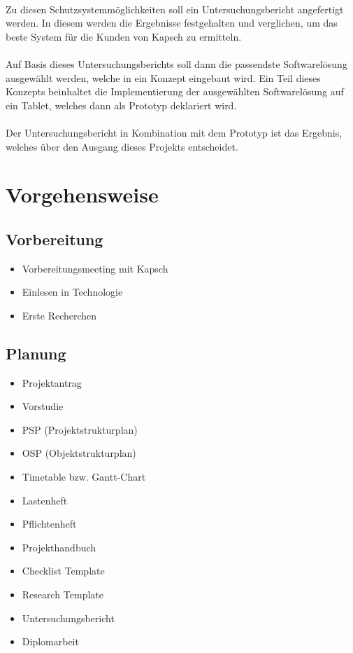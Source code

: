 \paragraph*{}
Zu diesen Schutzsystemmöglichkeiten soll ein Untersuchungsbericht angefertigt werden. In diesem werden die Ergebnisse  festgehalten und verglichen, um das beste System für die Kunden von Kapsch zu ermitteln.
\paragraph*{}
Auf Basis dieses Untersuchungsberichts soll dann die passendste Softwarelösung ausgewählt werden, welche in ein Konzept eingebaut wird. Ein Teil dieses Konzepts beinhaltet die Implementierung der ausgewählten Softwarelösung auf ein Tablet, welches dann als Prototyp deklariert wird. 
\paragraph*{}
Der Untersuchungsbericht in Kombination mit dem Prototyp ist das Ergebnis, welches über den Ausgang dieses Projekts entscheidet.


\section{Vorgehensweise}
\subsection{Vorbereitung}
\begin{itemize}
	\item Vorbereitungsmeeting mit Kapsch
	\item Einlesen in Technologie
	\item Erste Recherchen
\end{itemize}
\subsection{Planung}
\begin{itemize}
	\item Projektantrag
	\item Vorstudie
	\item PSP (Projektstrukturplan)
	\item OSP (Objektstrukturplan)
	\item Timetable bzw. Gantt-Chart
	\item Lastenheft
	\item Pflichtenheft
	\item Projekthandbuch
	\item Checklist Template
	\item Research Template
	\item Untersuchungsbericht
	\item Diplomarbeit
\end{itemize}
